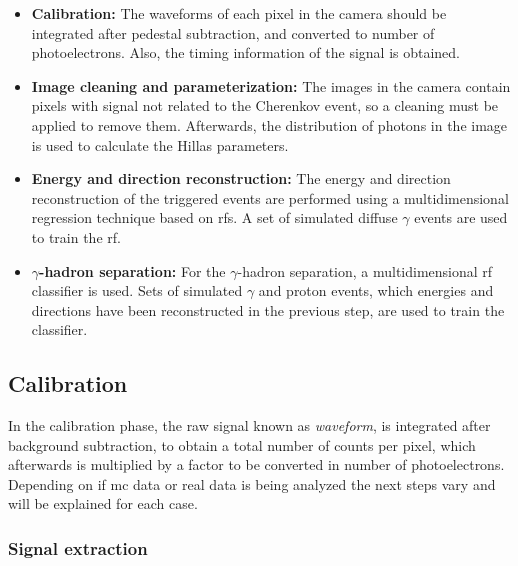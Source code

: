 \documentclass[main.tex]{subfiles}
\begin{document}
\begin{itemize}
\item\textbf{Calibration:} The waveforms of each pixel in the camera should be integrated after pedestal subtraction, and converted to number of photoelectrons. Also, the timing information of the signal is obtained. 
\item\textbf{Image cleaning and parameterization:} The images in the camera contain pixels with signal not related to the Cherenkov event, so a cleaning must be applied to remove them. Afterwards, the distribution of photons in the image is used to calculate the Hillas parameters.
\item\textbf{Energy and direction reconstruction:} The energy and direction reconstruction of the triggered events are performed using a multidimensional regression technique based on \glspl{rf}. A set of simulated diffuse $\gamma$ events are used to train the \gls{rf}. 
\item\textbf{$\gamma$-hadron separation:} For the $\gamma$-hadron separation, a multidimensional \gls{rf} classifier is used. Sets of simulated $\gamma$ and proton events, which energies and directions have been reconstructed in the previous step, are used to train the classifier.
\end{itemize}

\subsection{Calibration} \label{sec:calib}

In the calibration phase, the raw signal known as \textit{waveform}, is integrated after background subtraction, to obtain a total number of counts per pixel, which afterwards is multiplied by a factor to be converted in number of photoelectrons. Depending on if \gls{mc} data or real data is being analyzed the next steps vary and will be explained for each case.

\subsubsection{Signal extraction} \label{sec:signalext}
\end{document}
